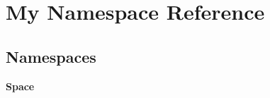 \section{My Namespace Reference}
\label{namespace_my}
\subsection*{Namespaces}
\begin{DoxyCompactItemize}
\item 
 {\bf Space}
\end{DoxyCompactItemize}
